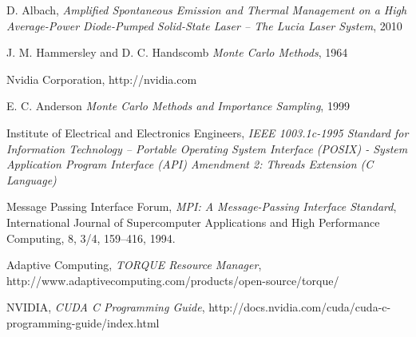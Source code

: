 \begin{thebibliography}{9}


    D. Albach,
    \emph{Amplified Spontaneous Emission and Thermal Management on a High Average-Power Diode-Pumped Solid-State Laser \--- The Lucia Laser System},
    2010

    J. M. Hammersley and D. C. Handscomb
    \emph{Monte Carlo Methods},
    1964

    Nvidia Corporation,
    http://nvidia.com

    E. C. Anderson
    \emph{Monte Carlo Methods and Importance Sampling},
    1999

    Institute of Electrical and Electronics Engineers,
    \emph{IEEE 1003.1c-1995 Standard for Information Technology \---
    Portable Operating System Interface (POSIX) \-- System Application Program Interface (API) Amendment 2: Threads Extension (C Language)}

    Message Passing Interface Forum,
    \emph{MPI: A Message-Passing Interface Standard}, 
    International Journal of Supercomputer Applications and High Performance Computing,
    8, 3/4, 159–416, 1994.

    Adaptive Computing,
    \emph{TORQUE Resource Manager},
    http://www.adaptivecomputing.com/products/open-source/torque/

    NVIDIA,
    \emph{CUDA C Programming Guide},
    http://docs.nvidia.com/cuda/cuda-c-programming-guide/index.html



\end{thebibliography}
